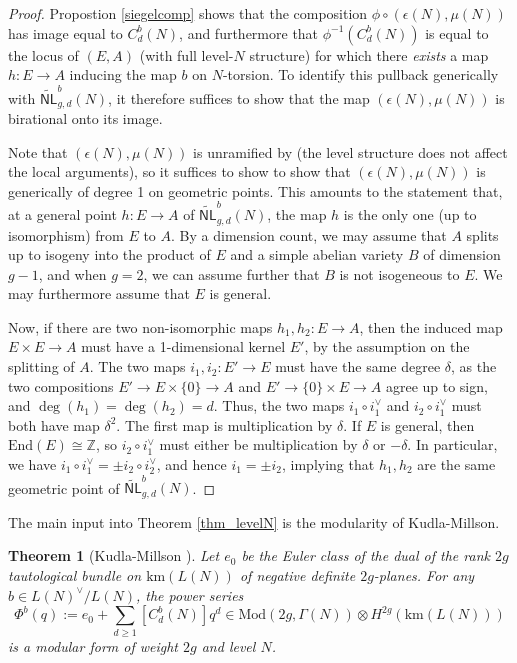 \documentclass[12pt]{amsart}
\def\bZ{\mathbb{Z}}
\newcommand{\A}{\mathcal A}
\newcommand{\Mod}{\mathrm{Mod}}
\newcommand{\Mat}{\mathrm{Mat}}
\newcommand{\wNL}{{\widetilde{\mathsf{NL}}}}
\newcommand{\km}{\mathrm{km}}
\newtheorem{thm}{Theorem}[section]
\theoremstyle{definition}
\begin{document}
\begin{proof}
Propostion \ref{siegelcomp} shows that the composition $\phi\circ(\epsilon(N),\mu(N))$ has image equal to $C^b_d(N)$, and furthermore that $\phi^{-1}(C^b_d(N))$ is equal to the locus of $(E,A)$ (with full level-$N$ structure) for which there \emph{exists} a map $h:E\to A$ inducing the map $b$ on $N$-torsion. To identify this pullback generically with $\wNL_{g,d}^b(N)$, it therefore suffices to show that the map $(\epsilon(N),\mu(N))$ is birational onto its image. 

Note that $(\epsilon(N),\mu(N))$ is unramified by \cite[Proposition 3.6]{gl} (the level structure does not affect the local arguments), so it suffices to show to show that $(\epsilon(N),\mu(N))$ is generically of degree 1 on geometric points. This amounts to the statement that, at a general point $h:E\to A$ of $\wNL_{g,d}^b(N)$, the map $h$ is the only one (up to isomorphism) from $E$ to $A$. By a dimension count, we may assume that $A$ splits up to isogeny into the product of $E$ and a simple abelian variety $B$ of dimension $g-1$, and when $g=2$, we can assume further that $B$ is not isogeneous to $E$. We may furthermore assume that $E$ is general. 

Now, if there are two non-isomorphic maps $h_1,h_2:E\to A$, then the induced map $E\times E\to A$ must have a 1-dimensional kernel $E'$, by the assumption on the splitting of $A$. The two maps $i_1,i_2:E'\to E$ must have the same degree $\delta$, as the two compositions $E'\to E\times\{0\} \to A$ and $E'\to \{0\}\times E\to A$ agree up to sign, and $\deg(h_1)=\deg(h_2)=d$. Thus, the two maps $i_1\circ i_1^\vee$ and $i_2\circ i_1^\vee$ must both have map $\delta^2$. The first map is multiplication by $\delta$. If $E$ is general, then $\text{End}(E)\cong\bZ$, so $i_2\circ i_1^{\vee}$ must either be multiplication by $\delta$ or $-\delta$. In particular, we have $i_1\circ i_1^{\vee}=\pm i_2\circ i_2^\vee$, and hence $i_1=\pm i_2$, implying that $h_1,h_2$ are the same geometric point of $\wNL_{g,d}^b(N)$.
\end{proof}

The main input into Theorem \ref{thm_levelN} is the modularity of Kudla-Millson.

\begin{thm}[Kudla-Millson \cite{km}]
Let $e_0$ be the Euler class of the dual of the rank $2g$ tautological bundle on $\km(L(N))$ of negative definite $2g$-planes. For any $b\in L(N)^\vee/L(N)$, the power series
\begin{equation*}
    \Phi^{b}(q):=e_0+\sum_{d\ge1}[C^b_d(N)]q^d \in \Mod(2g,\Gamma(N))\otimes H^{2g}(\km(L(N)))
\end{equation*}
is a modular form of weight $2g$ and level $N$.
\end{thm}
\end{document}
